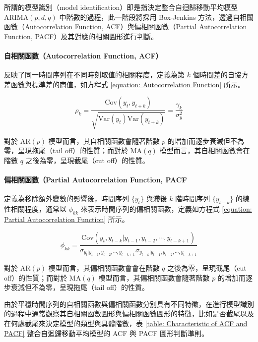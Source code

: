 所謂的模型識別（model identification）即是指決定整合自迴歸移動平均模型 $\text{ARIMA}(p, d, q)$ 中階數的過程，此一階段將採用 Box-Jenkins 方法，透過自相關函數（Autocorrelation Function, ACF）與偏相關函數（Partial Autocorrelation Function, PACF）及其對應的相關圖形進行判斷。

\paragraph{自相關函數（Autocorrelation Function, ACF）} 

反映了同一時間序列在不同時刻取值的相關程度，定義為第 $k$ 個時間差的自協方差函數與標準差的商值，如方程式 \eqref{equation: Autocorrelation Function} 所示。

\begin{equation}\label{equation: Autocorrelation Function}
  \rho_{k} = \frac{\mathrm{Cov}(y_t, y_{t + k})}{\sqrt{\mathrm{Var}(y_{t})\mathrm{Var}(y_{t+k})}} = \frac{\gamma_{k}}{\sigma_{y}^{2}}
\end{equation}

對於 $\text{AR}(p)$ 模型而言，其自相關函數會隨著階數 $p$ 的增加而逐步衰減但不為零，呈現拖尾（tail off）的性質；而對於 $\text{MA}(q)$ 模型而言，其自相關函數會在階數 $q$ 之後為零，呈現截尾（cut off）的性質。

\paragraph{偏相關函數（Partial Autocorrelation Function, PACF} 

定義為移除額外變數的影響後，時間序列 $\{ y_t \}$ 與滯後 $k$ 階時間序列 $\{ y_{t-k} \}$ 的線性相關程度，通常以 $\phi_{kk}$ 來表示時間序列的偏相關函數，定義如方程式 \eqref{equation: Partial Autocorrelation Function} 所示。

\begin{equation}\label{equation: Partial Autocorrelation Function}
  \phi_{kk} = \frac{\mathrm{Cov}(y_t, y_{t-k} | y_{t-1}, y_{t-2}, \cdots, y_{t-k+1})}{\sigma_{y_{t} | y_{t-1}, y_{t-2}, \cdots, y_{t-k+1}} \sigma_{y_{t-k} | y_{t-1}, y_{t-2}, \cdots, y_{t-k+1}}}
\end{equation}

對於 $\text{AR}(p)$ 模型而言，其偏相關函數會會在階數 $q$ 之後為零，呈現截尾（cut off）的性質；而對於 $\text{MA}(q)$ 模型而言，其偏相關函數會隨著階數 $p$ 的增加而逐步衰減但不為零，呈現拖尾（tail off）的性質。

由於平穩時間序列的自相關函數與偏相關函數分別具有不同特徵，在進行模型識別的過程中通常觀察其自相關函數圖形與偏相關函數圖形的特徵，比如是否截尾以及在何處截尾來決定模型的類型與具體階數，表 \ref{table: Characteristic of ACF and PACF} 整合自迴歸移動平均模型的 ACF 與 PACF 圖形判斷準則。

